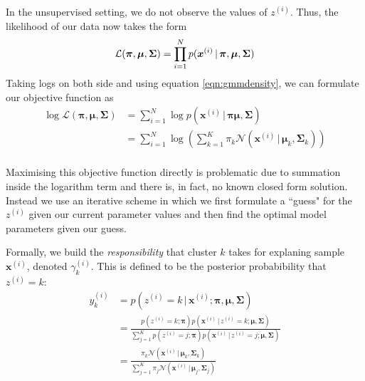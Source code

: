 \documentclass[final,3p,times,twocolumn]{elsarticle}
\begin{document}
In the unsupervised setting, we do not observe the values of $z^{(i)}$. 
Thus, the likelihood of our data now takes the form
\begin{equation}
	\mathcal{L}(\boldsymbol \pi, \boldsymbol \mu, \boldsymbol \Sigma) = \prod_{i=1}^N p(\boldsymbol x^{(i)}\,|\,\boldsymbol \pi, \boldsymbol \mu, \boldsymbol \Sigma)\\
\label{eqn:gmmLikelihood}
\end{equation}
Taking logs on both side and using equation \ref{eqn:gmmdensity}, we can formulate our objective function as
\begin{equation}
\begin{split}
\log\mathcal{L}(\boldsymbol \pi, \boldsymbol \mu, \boldsymbol \Sigma) &= \sum_{i=1}^N \log p(\boldsymbol x^{(i)}\,|\,\boldsymbol \pi \boldsymbol \mu, \boldsymbol \Sigma)\\
&= \sum_{i=1}^N \log \left(\sum_{k=1}^K \pi_k \mathcal{N}(\boldsymbol x^{(i)}\,|\, \boldsymbol \mu_k, \boldsymbol \Sigma_k)\right)\\
\end{split}
\label{eqn:gmmlogLikelihood}
\end{equation}

Maximising this objective function directly is problematic due to summation inside the logarithm term and there is, in fact, no known closed form solution.
Instead we use an iterative scheme in which we first formulate a ``guess" for the $z^{(i)}$ given our current parameter values and then find the optimal model parameters given our guess. 

Formally, we build the \emph{responsibility} that cluster $k$ takes for explaning sample $\boldsymbol x^{(i)}$, denoted $\gamma_k^{(i)}$.
This is defined to be the posterior probabibility that $z^{(i)} = k$:
\begin{equation}
\label{eqn:gmmresponsibility}
\begin{split}
y_k^{(i)} &= p(z^{(i)}=k\,|\,\boldsymbol x^{(i)}; \boldsymbol \pi, \boldsymbol \mu, \boldsymbol \Sigma)\\
	&= \frac{p(z^{(i)}=k;\boldsymbol \pi)p(\boldsymbol x^{(i)}\,|\,z^{(i)}=k;\boldsymbol \mu, \boldsymbol \Sigma)}
	{\sum_{j=1}^K p(z^{(i)}=j;\boldsymbol \pi)p(\boldsymbol x^{(i)}\,|\,z^{(i)}=j;\boldsymbol \mu, \boldsymbol \Sigma)}\\
	&= \frac{\pi_k\mathcal{N}(\boldsymbol x^{(i)}\,|\,\boldsymbol \mu_k, \boldsymbol \Sigma_k)}
	{\sum_{j=1}^K \pi_j\mathcal{N}(\boldsymbol x^{(i)}\,|\,\boldsymbol \mu_j, \boldsymbol \Sigma_j)}
\end{split}
\end{equation}
\end{document}
